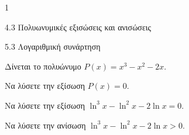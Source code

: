 \begin{ylh}{1}
\item 4.3 Πολυωνυμικές εξισώσεις και ανισώσεις
\item 5.3 Λογαριθμική συνάρτηση
\end{ylh}
Δίνεται το πολυώνυμο $P(x) = x^3 - x^2 - 2x$.
\begin{alist}
\item Να λύσετε την εξίσωση $P(x) = 0$.
\item Να λύσετε την εξίσωση $\ln^3 x - \ln^2 x - 2\ln x = 0$.
\item Να λύσετε την ανίσωση $\ln^3 x - \ln^2 x - 2\ln x > 0$.
\end{alist}

